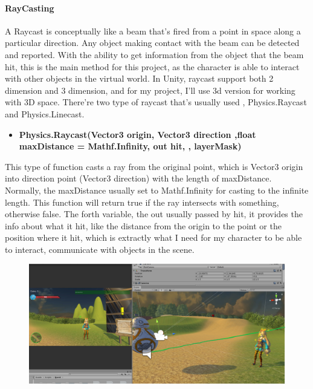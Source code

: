 \documentclass[a4paper, 13pt]{extarticle}
\begin{document}
\paragraph{RayCasting}
  A Raycast is conceptually like a beam that's fired from a point in space along a particular direction. Any object making contact with the beam can be detected and reported. With the ability to get information from the object that the beam hit, this is the main method for this project, as the character is able to interact with other objects in the virtual world. In Unity, raycast support both 2 dimension and 3 dimension, and for my project, I'll use 3d version for working with 3D space. There're two type of raycast that's usually used , Physics.Raycast and Physics.Linecast.
  \begin{itemize}
  	\item \bfseries Physics.Raycast(Vector3 origin,  Vector3 direction ,float maxDistance = Mathf.Infinity, out hit, , layerMask)	 	
  \end{itemize}
 	This type of function casts a ray from the original point, which is Vector3 origin into direction point (Vector3 direction) with the length of maxDistance. Normally, the maxDistance usually set to Mathf.Infinity for casting to the infinite length. This function will return true if the ray intersects with something, otherwise false. The forth variable, the out usually passed by hit, it provides the info about what it hit, like the distance from the origin to the point or the position where it hit, which is extractly what I need for my character to be able to interact, communicate with objects in the scene.
 	\begin{figure}[h]
 		
 		\begin{minipage}{1\textwidth}
 			\centering
 			\includegraphics[width=1\linewidth]{intructions/RayCast_example1.png}
 			\centering
 			\label{fig:test14}
 		\end{minipage}
 	
 	\end{figure} 
 	
\end{document}
